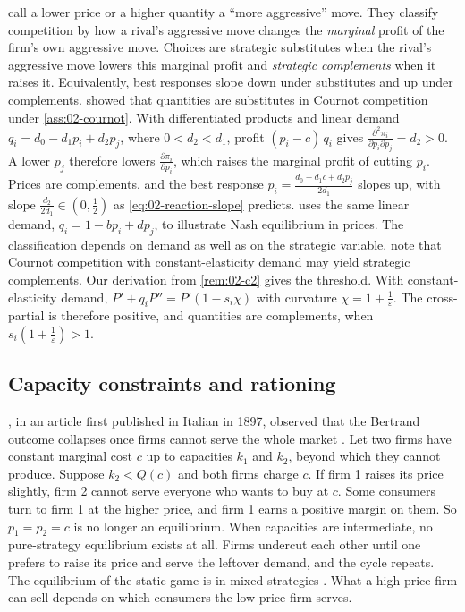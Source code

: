\begin{remark}\label{rem:02-strategic}
\citet[p.~489]{BulowGeanakoplosKlemperer1985} call a lower price or a higher quantity a ``more aggressive'' move.
They classify competition by how a rival's aggressive move changes the \emph{marginal} profit of the firm's own
aggressive move. Choices are strategic substitutes when the rival's aggressive move lowers this marginal profit and
\emph{strategic complements} when it raises it.
Equivalently, best responses slope down under substitutes and up under complements. 
showed that quantities are substitutes in Cournot competition under \cref{ass:02-cournot}. With differentiated products and linear demand
$q_i = d_0 - d_1 p_i + d_2 p_j$, where $0 < d_2 < d_1$, profit $(p_i - c)\, q_i$ gives
$\frac{\partial^2 \pi_i}{\partial p_i \partial p_j} = d_2 > 0$. A lower $p_j$ therefore lowers
$\frac{\partial \pi_i}{\partial p_i}$, which raises the marginal profit of cutting $p_i$. Prices are complements, and
the best response $p_i = \frac{d_0 + d_1 c + d_2 p_j}{2 d_1}$ slopes up, with slope
$\frac{d_2}{2d_1} \in \left(0, \frac{1}{2}\right)$ as \eqref{eq:02-reaction-slope} predicts. \citet[sec.~11.2]{Tirole1988}
uses the same linear demand, $q_i = 1 - bp_i + dp_j$, to illustrate Nash equilibrium in prices. The classification
depends on demand as well as on the strategic variable. \citet[p.~490]{BulowGeanakoplosKlemperer1985} note that
Cournot competition with constant-elasticity demand may yield strategic complements. Our derivation from
\cref{rem:02-c2} gives the threshold. With constant-elasticity demand, $P' + q_i P'' = P'\left(1 - s_i \chi\right)$ with
curvature $\chi = 1 + \frac{1}{\varepsilon}$. The cross-partial is therefore positive, and quantities are complements,
when $s_i\left(1 + \frac{1}{\varepsilon}\right) > 1$.
\end{remark}

\subsection{Capacity constraints and rationing}\label{sec:02-capacity}

\citet{Edgeworth1925}, in an article first published in Italian in 1897, observed that the Bertrand outcome collapses
once firms cannot serve the whole market \citep[sec.~5.2.1]{Tirole1988}. Let two
firms have constant marginal cost $c$ up to capacities $k_1$ and $k_2$, beyond which they cannot produce. Suppose
$k_2 < Q(c)$ and both firms charge $c$. If firm 1 raises its price slightly, firm 2 cannot serve everyone who wants to
buy at $c$. Some consumers turn to firm 1 at the higher price, and firm 1 earns a positive margin on them. So
$p_1 = p_2 = c$ is no longer an equilibrium. When capacities are intermediate, no pure-strategy equilibrium exists at
all. Firms undercut each other until one prefers to raise its price and serve the leftover demand, and the cycle
repeats. The equilibrium of the static game is in mixed strategies \citep{LevitanShubik1972}. What a high-price firm
can sell depends on which consumers the low-price firm serves.

